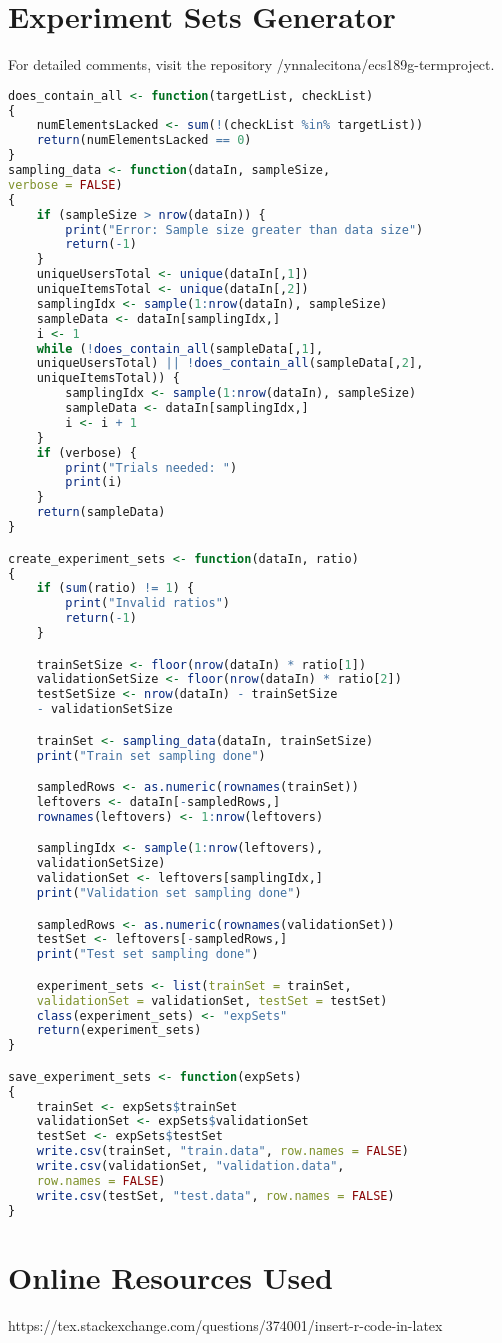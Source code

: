 \documentclass{article}
\begin{document}
\section {Experiment Sets Generator}
For detailed comments, visit the repository
/ynnalecitona/ecs189g-termproject.
\begin{lstlisting}[language = R]
does_contain_all <- function(targetList, checkList)
{
    numElementsLacked <- sum(!(checkList %in% targetList))
    return(numElementsLacked == 0)
}
sampling_data <- function(dataIn, sampleSize, 
verbose = FALSE) 
{
    if (sampleSize > nrow(dataIn)) {
        print("Error: Sample size greater than data size")
        return(-1)
    }
    uniqueUsersTotal <- unique(dataIn[,1])
    uniqueItemsTotal <- unique(dataIn[,2])
    samplingIdx <- sample(1:nrow(dataIn), sampleSize)
    sampleData <- dataIn[samplingIdx,]
    i <- 1
    while (!does_contain_all(sampleData[,1], 
    uniqueUsersTotal) || !does_contain_all(sampleData[,2], 
    uniqueItemsTotal)) {
        samplingIdx <- sample(1:nrow(dataIn), sampleSize)
        sampleData <- dataIn[samplingIdx,]
        i <- i + 1
    }
    if (verbose) {
        print("Trials needed: ")
        print(i)
    }
    return(sampleData)
}

create_experiment_sets <- function(dataIn, ratio)
{
    if (sum(ratio) != 1) {
        print("Invalid ratios")
        return(-1)
    }

    trainSetSize <- floor(nrow(dataIn) * ratio[1])
    validationSetSize <- floor(nrow(dataIn) * ratio[2])
    testSetSize <- nrow(dataIn) - trainSetSize 
    - validationSetSize

    trainSet <- sampling_data(dataIn, trainSetSize)
    print("Train set sampling done")

    sampledRows <- as.numeric(rownames(trainSet))
    leftovers <- dataIn[-sampledRows,]
    rownames(leftovers) <- 1:nrow(leftovers)

    samplingIdx <- sample(1:nrow(leftovers), 
    validationSetSize)
    validationSet <- leftovers[samplingIdx,]
    print("Validation set sampling done")

    sampledRows <- as.numeric(rownames(validationSet))
    testSet <- leftovers[-sampledRows,]
    print("Test set sampling done")

    experiment_sets <- list(trainSet = trainSet, 
    validationSet = validationSet, testSet = testSet)
    class(experiment_sets) <- "expSets"
    return(experiment_sets)
}

save_experiment_sets <- function(expSets)
{
    trainSet <- expSets$trainSet
    validationSet <- expSets$validationSet
    testSet <- expSets$testSet
    write.csv(trainSet, "train.data", row.names = FALSE)
    write.csv(validationSet, "validation.data", 
    row.names = FALSE)
    write.csv(testSet, "test.data", row.names = FALSE)
}

\end{lstlisting}

\section{Online Resources Used}
https://tex.stackexchange.com/questions/374001/insert-r-code-in-latex
\end{document}
